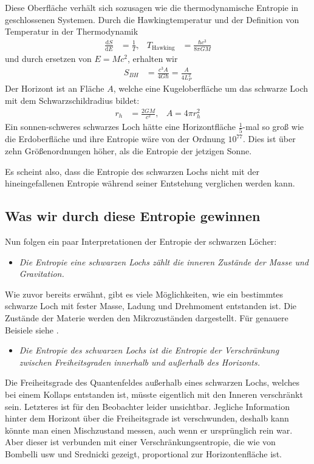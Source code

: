 \documentclass[ngerman]{scrartcl}
\newcommand{\diff}{\mathrm{d}}
\begin{document}
	Diese Oberfläche verhält sich sozusagen wie die thermodynamische Entropie in geschlossenen Systemen. 
	Durch die Hawkingtemperatur \cite{ParticleCreation} und der Definition von Temperatur in der Thermodynamik
		\begin{align}
			\frac{\diff S}{\diff E} &= \frac{1}{T},&
			T_{\text{Hawking}} &= \frac{\hbar c^3}{8 \pi G M}
		\end{align}
	und durch ersetzen von $E = Mc^2$, erhalten wir
		\begin{align} \label{SHentropie}
			S_{BH} &= \frac{c^3 A}{4 G \hbar} = \frac{A}{4 L_P^2} 
		\end{align}
	Der Horizont ist an Fläche $A$, welche eine Kugeloberfläche um das schwarze Loch mit dem Schwarzschildradius bildet:
		\begin{align}
			r_h &= \frac{2 GM}{c^2} ,& A = 4 \pi r_h^2 
		\end{align}
	Ein sonnen-schweres schwarzes Loch hätte eine Horizontfläche $\frac{1}{5}$-mal so groß wie die Erdoberfläche und ihre Entropie wäre von der Ordnung $10^{77}$. Dies ist über zehn Größenordnungen höher, als die Entropie der jetzigen Sonne.  
	
	Es scheint also, dass die Entropie des schwarzen Lochs nicht mit der hineingefallenen Entropie während seiner Entstehung verglichen werden kann.
	
	\subsection*{Was wir durch diese Entropie gewinnen}
	Nun folgen ein paar Interpretationen der Entropie der schwarzen Löcher:
	
	\begin{itemize}
		\item [~] \textit{Die Entropie eine schwarzen Lochs zählt die inneren Zustände der Masse und Gravitation.}
	\end{itemize}
	Wie zuvor bereits erwähnt, gibt es viele Möglichkeiten, wie ein bestimmtes schwarze Loch mit fester Masse, Ladung und Drehmoment entstanden ist. Die Zustände der Materie werden den Mikrozuständen dargestellt. Für genauere Beisiele siehe \cite{FrolovNovikov}.
	
	\begin{itemize}
		\item [~] \textit{Die Entropie des schwarzen Lochs ist die Entropie der Verschränkung zwischen Freiheitsgraden innerhalb und außerhalb des Horizonts.}
	\end{itemize}
	Die Freiheitsgrade des Quantenfeldes außerhalb eines schwarzen Lochs, welches bei einem Kollaps entstanden ist, müsste eigentlich mit den Inneren verschränkt sein. Letzteres ist für den Beobachter leider unsichtbar. Jegliche Information hinter dem Horizont über die Freiheitsgrade ist verschwunden, deshalb kann könnte man einen Mischzustand messen, auch wenn er ursprünglich rein war. Aber dieser ist verbunden mit einer Verschränkungsentropie, die wie von Bombelli usw \cite{BombelliKouLeeSorkin} und Srednicki \cite{Srednicki} gezeigt, proportional zur Horizontenfläche ist.
	
\end{document}
